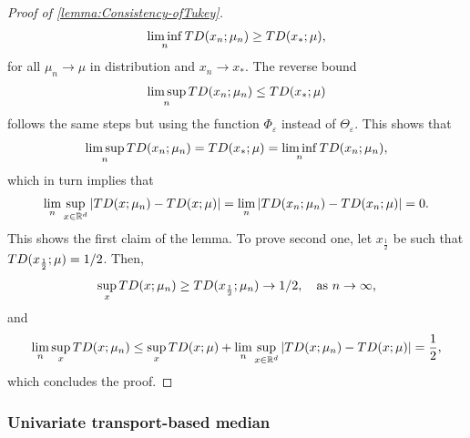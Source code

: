 \documentclass[11pt]{article}
\newcommand{\R}{\mathbb{R}}
\newcommand{\eps}{\varepsilon}
\theoremstyle{plain}
\theoremstyle{definition}
\begin{document}
{\begin{proof}[Proof of \autoref{lemma:Consistency-ofTukey}]
$$ \liminf_{n}  {\rm TD}(x_n; \mu_n) \geq {\rm TD}(x_*; \mu),   $$
for all $\mu_n \to \mu$ in distribution and $x_n\to x_*$. 
The reverse bound $$  \limsup_{n}  {\rm TD}(x_n; \mu_n) \leq {\rm TD}(x_*; \mu) $$ 
follows the same steps but using the function $\Phi_\eps$ instead of $\Theta_\eps$. This shows that 
%
$$ \limsup_{n}  {\rm TD}(x_n; \mu_n) =  {\rm TD}(x_*; \mu)=\liminf_{n}  {\rm TD}(x_n; \mu_n) , $$
%
which in turn implies that
$$ \lim_n \sup_{x\in \R^d}|{\rm TD}(x; \mu_n) - {\rm TD}(x; \mu)|= \lim_n |{\rm TD}(x_n; \mu_n) - {\rm TD}(x_n; \mu)|=0 .$$
%
This shows the first claim of the lemma. To prove second one, let $x_{\frac{1}{2}}$ be such that ${\rm TD}(x_{\frac{1}{2}}; \mu)=1/2$. Then, 
%
$$\sup_x {\rm TD}(x; \mu_n) \geq  {\rm TD}(x_{\frac{1}{2}}; \mu_n) \to  1/2, \quad \text{as $n\to \infty$,}$$
%
and 
%
$$ \lim_{n} \sup_x {\rm TD}(x; \mu_n) \leq  \sup_x {\rm TD}(x; \mu) + \lim_n \sup_{x\in \R^d}|{\rm TD}(x; \mu_n) - {\rm TD}(x; \mu)| = \frac{1}{2} , $$
%
which concludes the proof.

 \end{proof}
}

 \subsubsection{Univariate transport-based median}\label{Section:univariate median}
\end{document}
